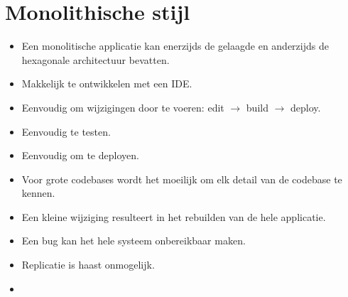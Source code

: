 	\section{Monolithische stijl}
		\begin{itemize}
			\item Een monolitische applicatie kan enerzijds de gelaagde en anderzijds de hexagonale architectuur bevatten.
			\item[\good] Makkelijk te ontwikkelen met een IDE.
			\item[\good] Eenvoudig om wijzigingen door te voeren: edit $\rightarrow$ build $\rightarrow$ deploy.
			\item[\good] Eenvoudig te testen.
			\item[\good] Eenvoudig om te deployen.
			\item[\alert] Voor grote codebases wordt het moeilijk om elk detail van de codebase te kennen.
			\item[\alert] Een kleine wijziging resulteert in het rebuilden van de hele applicatie.
			\item[\alert] Een bug kan het hele systeem onbereikbaar maken.
			\item[\alert] Replicatie is haast onmogelijk. 
			\item[\alert] 
		\end{itemize}
